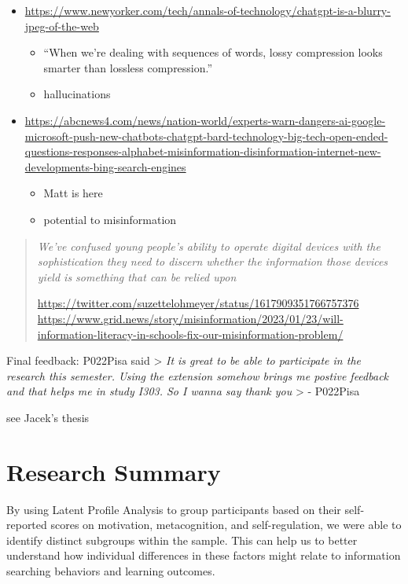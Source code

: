 \documentclass[letterpaper, nobind]{templates/ociamthesis}
\providecommand{\tightlist}{%
  \setlength{\itemsep}{0pt}\setlength{\parskip}{0pt}}
\begin{document}
\begin{itemize}
\tightlist
\item
  \url{https://www.newyorker.com/tech/annals-of-technology/chatgpt-is-a-blurry-jpeg-of-the-web}

  \begin{itemize}
  \tightlist
  \item
    ``When we're dealing with sequences of words, lossy compression looks smarter than lossless compression.''
  \item
    hallucinations
  \end{itemize}
\item
  \url{https://abcnews4.com/news/nation-world/experts-warn-dangers-ai-google-microsoft-push-new-chatbots-chatgpt-bard-technology-big-tech-open-ended-questions-responses-alphabet-misinformation-disinformation-internet-new-developments-bing-search-engines}

  \begin{itemize}
  \tightlist
  \item
    Matt is here
  \item
    potential to misinformation
  \end{itemize}
\end{itemize}

\begin{quote}
\emph{We've confused young people's ability to operate digital devices with the sophistication they need to discern whether the information those devices yield is something that can be relied upon}

\url{https://twitter.com/suzettelohmeyer/status/1617909351766757376}
\url{https://www.grid.news/story/misinformation/2023/01/23/will-information-literacy-in-schools-fix-our-misinformation-problem/}
\end{quote}

Final feedback:
P022Pisa said
\textgreater{} \emph{It is great to be able to participate in the research this semester. Using the extension somehow brings me postive feedback and that helps me in study I303. So I wanna say thank you}
\textgreater{} - P022Pisa

see Jacek's thesis

\hypertarget{research-summary}{%
\section{Research Summary}\label{research-summary}}

By using Latent Profile Analysis to group participants based on their self-reported scores on motivation, metacognition, and self-regulation, we were able to identify distinct subgroups within the sample. This can help us to better understand how individual differences in these factors might relate to information searching behaviors and learning outcomes.
\end{document}
